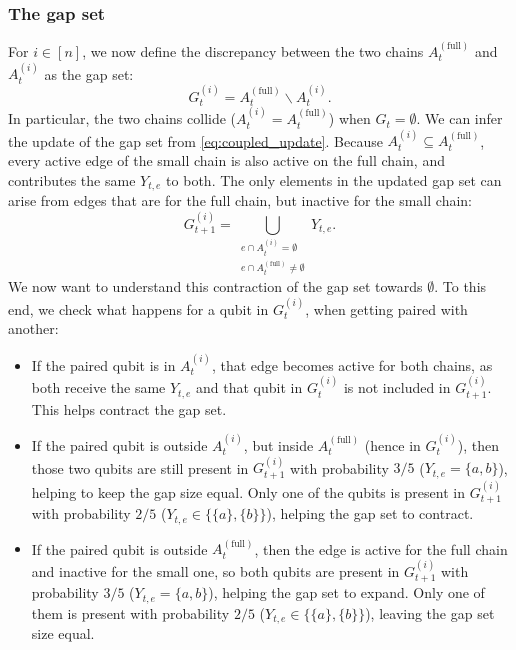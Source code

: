 \documentclass[
    aps,
    superscriptaddress,
    onecolumn,
    10pt,
    prx,
    nofootinbib
]{revtex4-2}
\theoremstyle{namedstatement}
\theoremstyle{plain}
\begin{document}
\subsubsection{The gap set} \label{sec:gapset}
For $i\in[n]$, we now define the discrepancy between the two chains $A^{(\mathrm{full})}_t$ and $A_t^{(i)}$ as the gap set:
\begin{equation}
    G_t^{(i)}= A^{(\mathrm{full})}_t \backslash A_t^{(i)}.
\end{equation}
In particular, the two chains collide ($A_t^{(i)}=A^{(\mathrm{full})}_t$) when $G_t=\emptyset$. We can infer the update of the gap set from \cref{eq:coupled_update}. Because $A_t^{(i)} \subseteq A^{(\mathrm{full})}_t$, every active edge of the small chain is also active on the full chain, and contributes the same $Y_{t,e}$ to both. The only elements in the updated gap set can arise from edges that are for the full chain, but inactive for the small chain:
\begin{equation}
    G_{t+1}^{(i)}
=
\bigcup_{\substack{
e\cap A_t^{(i)}=\emptyset\\
e\cap A_t^{(\mathrm{full})}\neq\emptyset
}}
Y_{t,e}.
\end{equation}
We now want to understand this contraction of the gap set towards $\emptyset$. To this end, we check what happens for a qubit in $G_t^{(i)}$, when getting paired with another: 
\begin{itemize}
    \item If the paired qubit is in $A_t^{(i)}$, that edge becomes active for both chains, as both receive the same $Y_{t,e}$ and that qubit in $G_t^{(i)}$ is not included in $G_{t+1}^{(i)}$. This helps contract the gap set.
    \item If the paired qubit is outside $A_t^{(i)}$, but inside $A_t^{(\mathrm{full})}$ (hence in $G_t^{(i)}$), then those two qubits are still present in $G_{t+1}^{(i)}$ with probability $3/5$ ($Y_{t,e}=\{a,b\}$), helping to keep the gap size equal. Only one of the qubits is present in $G_{t+1}^{(i)}$ with probability $2/5$ ($Y_{t,e}\in \{\{a\},\{b\}\}$), helping the gap set to contract. 
    \item If the paired qubit is outside $A_t^{(\mathrm{full})}$, then the edge is active for the full chain and inactive for the small one, so both qubits are present in $G_{t+1}^{(i)}$ with probability $3/5$ ($Y_{t,e}=\{a,b\}$), helping the gap set to expand. Only one of them is present with probability $2/5$ ($Y_{t,e}\in\{\{a\},\{b\}\}$), leaving the gap set size equal.
\end{itemize}
\end{document}
